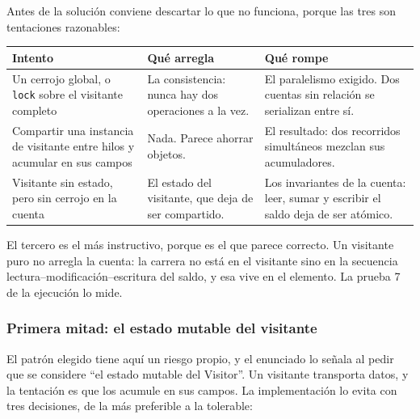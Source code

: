 Antes de la solución conviene descartar lo que no funciona, porque las tres son tentaciones
razonables:

\begin{table}[h!]
    \centering
    \small
    \begin{tabular}{p{4.3cm}p{4.2cm}p{4.9cm}}
        \toprule
        \textbf{Intento} & \textbf{Qué arregla} & \textbf{Qué rompe} \\
        \midrule
        Un cerrojo global, o \texttt{lock} sobre el visitante completo
        & La consistencia: nunca hay dos operaciones a la vez.
        & El paralelismo exigido. Dos cuentas sin relación se serializan entre sí. \\
        \addlinespace
        Compartir una instancia de visitante entre hilos y acumular en sus campos
        & Nada. Parece ahorrar objetos.
        & El resultado: dos recorridos simultáneos mezclan sus acumuladores. \\
        \addlinespace
        Visitante sin estado, pero sin cerrojo en la cuenta
        & El estado del visitante, que deja de ser compartido.
        & Los invariantes de la cuenta: leer, sumar y escribir el saldo deja de ser atómico. \\
        \bottomrule
    \end{tabular}
\end{table}

El tercero es el más instructivo, porque es el que parece correcto. Un visitante puro no
arregla la cuenta: la carrera no está en el visitante sino en la secuencia
lectura--modificación--escritura del saldo, y esa vive en el elemento. La prueba 7 de la
ejecución lo mide.

\subsubsection*{Primera mitad: el estado mutable del visitante}

El patrón elegido tiene aquí un riesgo propio, y el enunciado lo señala al pedir que se
considere ``el estado mutable del Visitor''. Un visitante transporta datos, y la tentación es
que los acumule en sus campos. La implementación lo evita con tres decisiones, de la más
preferible a la tolerable:

